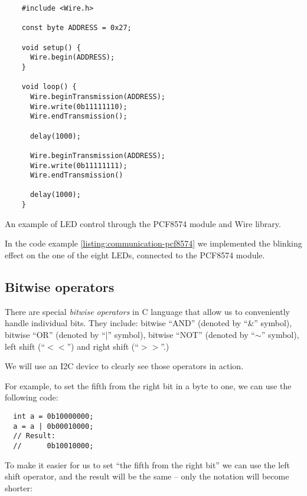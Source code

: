 \documentclass[../sparc.tex]{subfiles}
\begin{document}
\begin{listing}[H]
  \begin{verbatim}
    #include <Wire.h>

    const byte ADDRESS = 0x27;

    void setup() {
      Wire.begin(ADDRESS);
    }

    void loop() {
      Wire.beginTransmission(ADDRESS);
      Wire.write(0b11111110);
      Wire.endTransmission();

      delay(1000);

      Wire.beginTransmission(ADDRESS);
      Wire.write(0b11111111);
      Wire.endTransmission()

      delay(1000);
    }
  \end{verbatim}
  \label{listing:communication-pcf8574}
  \caption{An example of LED control through the PCF8574 module and Wire
    library.}
\end{listing}

In the code example \ref{listing:communication-pcf8574} we implemented the
blinking effect on the one of the eight LEDs, connected to the PCF8574 module.

\subsection{Bitwise operators}

There are special \emph{bitwise operators} in C language that allow us to
conveniently handle individual bits.  They include: bitwise ``AND'' (denoted by
``\&'' symbol), bitwise ``OR'' (denoted by ``|'' symbol), bitwise ``NOT''
(denoted by ``$\sim$'' symbol), left shift (``$<<$'') and right shift (``$>>$''.)

We will use an I2C device to clearly see those operators in action.

For example, to set the fifth from the right bit in a byte to one, we can use
the following code:

\begin{verbatim}
  int a = 0b10000000;
  a = a | 0b00010000;
  // Result:
  //      0b10010000;
\end{verbatim}

To make it easier for us to set ``the fifth from the right bit'' we can use the
left shift operator, and the result will be the same -- only the notation will
become shorter:
\end{document}
